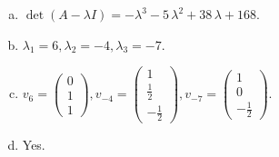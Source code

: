 \begin{questions}
\begin{solution}
\begin{enumerate}[(a)]
\item $\det(A-\lambda I)=-{\lambda}^{3} - 5 \, {\lambda}^{2} + 38 \, {\lambda} + 168$.
\item ${\lambda}_1=6, {\lambda}_2=-4, {\lambda}_3=-7$.
\item $v_{6}=\left(\begin{array}{r}
0 \\
1 \\
1
\end{array}\right), v_{-4}=\left(\begin{array}{r}
1 \\
\frac{1}{2} \\
-\frac{1}{2}
\end{array}\right), v_{-7}=\left(\begin{array}{r}
1 \\
0 \\
-\frac{1}{2}
\end{array}\right)$.
\item Yes.
\end{enumerate}
\end{solution}

\end{questions}

\newpage


\begin{center}
\end{center}

